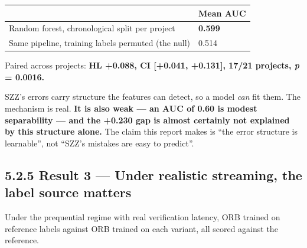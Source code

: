 \begin{longtable}[]{@{}ll@{}}
\toprule\noalign{}
& Mean AUC \\
\midrule\noalign{}
\endhead
\bottomrule\noalign{}
\endlastfoot
Random forest, chronological split per project & \textbf{0.599} \\
Same pipeline, training labels permuted (the null) & 0.514 \\
\end{longtable}

Paired across projects: \textbf{HL +0.088, CI {[}+0.041, +0.131{]},
17/21 projects, \emph{p} = 0.0016.}

SZZ's errors carry structure the features can detect, so a model
\emph{can} fit them. The mechanism is real. \textbf{It is also weak ---
an AUC of 0.60 is modest separability --- and the +0.230 gap is almost
certainly not explained by this structure alone.} The claim this report
makes is ``the error structure is learnable'', not ``SZZ's mistakes are
easy to predict''.

\subsection{5.2.5 Result 3 --- Under realistic streaming, the label
source
matters}\label{result-3-under-realistic-streaming-the-label-source-matters}

Under the prequential regime with real verification latency, ORB trained
on reference labels against ORB trained on each variant, all scored
against the reference.

